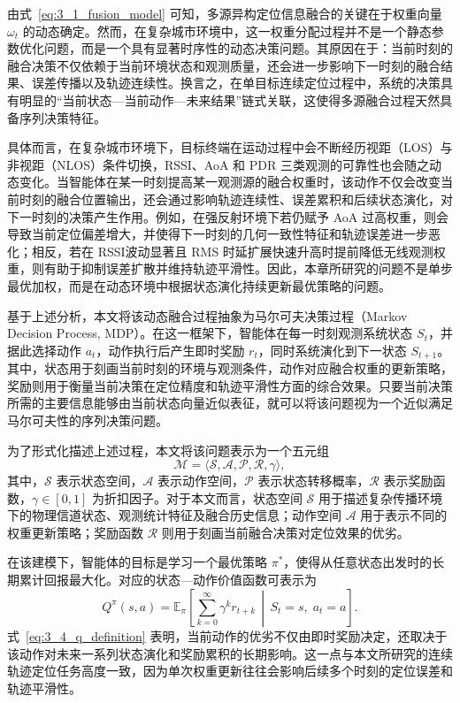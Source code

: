 由式~\eqref{eq:3_1_fusion_model} 可知，多源异构定位信息融合的关键在于权重向量 \(\omega_t\) 的动态确定。然而，在复杂城市环境中，这一权重分配过程并不是一个静态参数优化问题，而是一个具有显著时序性的动态决策问题。其原因在于：当前时刻的融合决策不仅依赖于当前环境状态和观测质量，还会进一步影响下一时刻的融合结果、误差传播以及轨迹连续性。换言之，在单目标连续定位过程中，系统的决策具有明显的“当前状态—当前动作—未来结果”链式关联，这使得多源融合过程天然具备序列决策特征。

具体而言，在复杂城市环境下，目标终端在运动过程中会不断经历视距（LOS）与非视距（NLOS）条件切换，RSSI、AoA 和 PDR 三类观测的可靠性也会随之动态变化。当智能体在某一时刻提高某一观测源的融合权重时，该动作不仅会改变当前时刻的融合位置输出，还会通过影响轨迹连续性、误差累积和后续状态演化，对下一时刻的决策产生作用。例如，在强反射环境下若仍赋予 AoA 过高权重，则会导致当前定位偏差增大，并使得下一时刻的几何一致性特征和轨迹误差进一步恶化；相反，若在 RSSI波动显著且 RMS 时延扩展快速升高时提前降低无线观测权重，则有助于抑制误差扩散并维持轨迹平滑性。因此，本章所研究的问题不是单步最优加权，而是在动态环境中根据状态演化持续更新最优策略的问题。

基于上述分析，本文将该动态融合过程抽象为马尔可夫决策过程（Markov Decision Process, MDP）。在这一框架下，智能体在每一时刻观测系统状态 \(S_t\)，并据此选择动作 \(a_t\)，动作执行后产生即时奖励 \(r_t\)，同时系统演化到下一状态 \(S_{t+1}\)。其中，状态用于刻画当前时刻的环境与观测条件，动作对应融合权重的更新策略，奖励则用于衡量当前决策在定位精度和轨迹平滑性方面的综合效果。只要当前决策所需的主要信息能够由当前状态向量近似表征，就可以将该问题视为一个近似满足马尔可夫性的序列决策问题。

为了形式化描述上述过程，本文将该问题表示为一个五元组
\begin{equation}
\mathcal{M}=\langle \mathcal{S},\mathcal{A},\mathcal{P},\mathcal{R},\gamma \rangle,
\label{eq:3_3_mdp_tuple}
\end{equation}
其中，\(\mathcal{S}\) 表示状态空间，\(\mathcal{A}\) 表示动作空间，\(\mathcal{P}\) 表示状态转移概率，\(\mathcal{R}\) 表示奖励函数，\(\gamma\in[0,1]\) 为折扣因子。对于本文而言，状态空间 \(\mathcal{S}\) 用于描述复杂传播环境下的物理信道状态、观测统计特征及融合历史信息；动作空间 \(\mathcal{A}\) 用于表示不同的权重更新策略；奖励函数 \(\mathcal{R}\) 则用于刻画当前融合决策对定位效果的优劣。

在该建模下，智能体的目标是学习一个最优策略 \(\pi^*\)，使得从任意状态出发时的长期累计回报最大化。对应的状态—动作价值函数可表示为
\begin{equation}
Q^{\pi}(s,a)
=
\mathbb{E}_{\pi}
\left[
\sum_{k=0}^{\infty}\gamma^k r_{t+k}
\,\middle|\,
S_t=s,\; a_t=a
\right].
\label{eq:3_4_q_definition}
\end{equation}
式~\eqref{eq:3_4_q_definition} 表明，当前动作的优劣不仅由即时奖励决定，还取决于该动作对未来一系列状态演化和奖励累积的长期影响。这一点与本文所研究的连续轨迹定位任务高度一致，因为单次权重更新往往会影响后续多个时刻的定位误差和轨迹平滑性。

